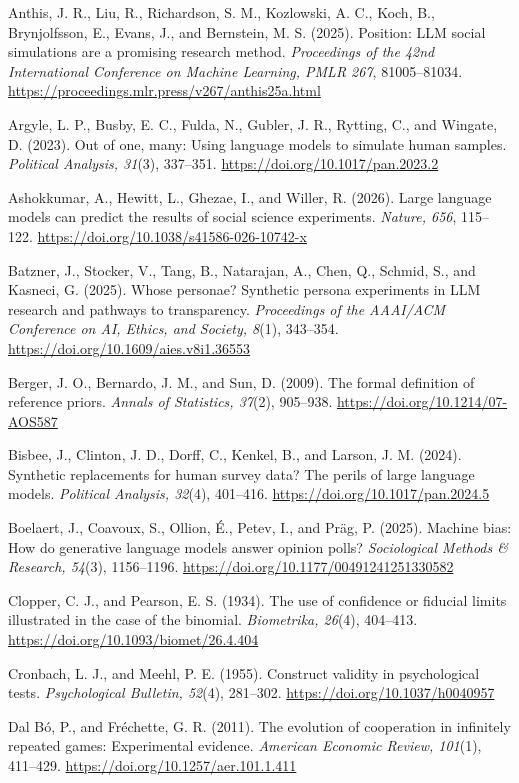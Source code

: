 \documentclass[11pt]{article}
\begin{document}
Anthis, J. R., Liu, R., Richardson, S. M., Kozlowski, A. C., Koch, B.,
Brynjolfsson, E., Evans, J., and Bernstein, M. S. (2025). Position: LLM
social simulations are a promising research method. \emph{Proceedings of
the 42nd International Conference on Machine Learning, PMLR 267},
81005--81034. \url{https://proceedings.mlr.press/v267/anthis25a.html}

Argyle, L. P., Busby, E. C., Fulda, N., Gubler, J. R., Rytting, C., and
Wingate, D. (2023). Out of one, many: Using language models to simulate
human samples. \emph{Political Analysis, 31}(3), 337--351.
\url{https://doi.org/10.1017/pan.2023.2}

Ashokkumar, A., Hewitt, L., Ghezae, I., and Willer, R. (2026). Large
language models can predict the results of social science experiments.
\emph{Nature, 656}, 115--122.
\url{https://doi.org/10.1038/s41586-026-10742-x}

Batzner, J., Stocker, V., Tang, B., Natarajan, A., Chen, Q., Schmid, S.,
and Kasneci, G. (2025). Whose personae? Synthetic persona experiments in
LLM research and pathways to transparency. \emph{Proceedings of the
AAAI/ACM Conference on AI, Ethics, and Society, 8}(1), 343--354.
\url{https://doi.org/10.1609/aies.v8i1.36553}

Berger, J. O., Bernardo, J. M., and Sun, D. (2009). The formal
definition of reference priors. \emph{Annals of Statistics, 37}(2),
905--938. \url{https://doi.org/10.1214/07-AOS587}

Bisbee, J., Clinton, J. D., Dorff, C., Kenkel, B., and Larson, J. M.
(2024). Synthetic replacements for human survey data? The perils of
large language models. \emph{Political Analysis, 32}(4), 401--416.
\url{https://doi.org/10.1017/pan.2024.5}

Boelaert, J., Coavoux, S., Ollion, É., Petev, I., and Präg, P. (2025).
Machine bias: How do generative language models answer opinion polls?
\emph{Sociological Methods \& Research, 54}(3), 1156--1196.
\url{https://doi.org/10.1177/00491241251330582}

Clopper, C. J., and Pearson, E. S. (1934). The use of confidence or
fiducial limits illustrated in the case of the binomial.
\emph{Biometrika, 26}(4), 404--413.
\url{https://doi.org/10.1093/biomet/26.4.404}

Cronbach, L. J., and Meehl, P. E. (1955). Construct validity in
psychological tests. \emph{Psychological Bulletin, 52}(4), 281--302.
\url{https://doi.org/10.1037/h0040957}

Dal Bó, P., and Fréchette, G. R. (2011). The evolution of cooperation in
infinitely repeated games: Experimental evidence. \emph{American
Economic Review, 101}(1), 411--429.
\url{https://doi.org/10.1257/aer.101.1.411}
\end{document}
